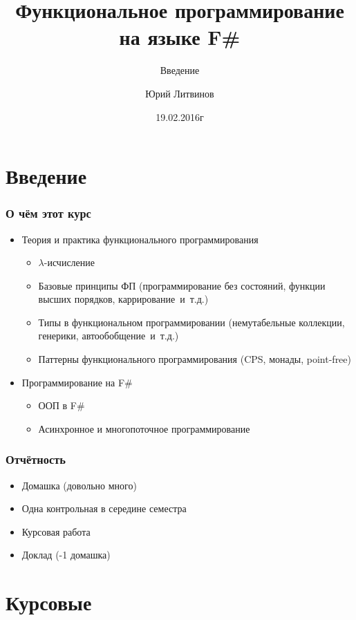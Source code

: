 \documentclass[xetex,mathserif,serif]{beamer}
\title{Функциональное программирование на языке F\#}
\subtitle{Введение}
\author{Юрий Литвинов}
\date{19.02.2016г}
\begin{document}
	
	\frame{\titlepage}
	
	\section{Введение}
	
	\begin{frame}
		\frametitle{О чём этот курс}
		\begin{itemize}
			\item Теория и практика функционального программирования
			\begin{itemize}
				\item $\lambda$-исчисление
				\item Базовые принципы ФП (программирование без состояний, 
					функции высших порядков, каррирование~и~т.д.)
				\item Типы в функциональном программировании (немутабельные коллекции,
					генерики, автообобщение~и~т.д.)
				\item Паттерны функционального программирования (CPS, монады, point-free)
			\end{itemize}
			\item Программирование на F\# 
			\begin{itemize}
				\item ООП в F\#
				\item Асинхронное и многопоточное программирование
			\end{itemize}
		\end{itemize}
	\end{frame}

	\begin{frame}
		\frametitle{Отчётность}
		\begin{itemize}
			\item Домашка (довольно много)
			\item Одна контрольная в середине семестра
			\item Курсовая работа
			\item Доклад (-1 домашка)			
		\end{itemize}					
	\end{frame}
	
	\section{Курсовые}		
\end{document}
